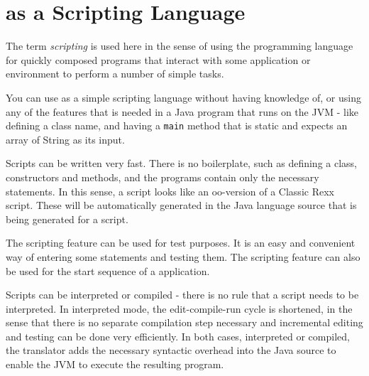 \chapter{\nr{} as a Scripting Language}\label{refscripting}
The term \emph{scripting} is used here in the sense of using the
programming language for quickly composed programs that interact with
some application or environment to perform a number of simple tasks.

You can use \nr{} as a simple scripting language without having
knowledge of, or using any of the features that is needed in a Java
program that runs on the JVM - like defining a class name, and having
a \texttt{main} method that is static and expects an array of String
as its input. 

Scripts can be written very fast. There is
no boilerplate, such as defining a class, constructors and methods, and the programs contain only
the necessary statements. In this sense, a \nr{} script looks like
an oo-version of a Classic Rexx script.  These will be automatically generated
in the Java language source that is being generated for a script.

The scripting feature can be used for test purposes. It is an easy and convenient way of entering some statements and testing them.
The scripting feature can also be used for the start sequence of a \nr{} application.

Scripts can be interpreted or compiled - there is no rule that a
script needs to be interpreted. In interpreted mode, the
edit-compile-run cycle is shortened, in the sense that there is no separate compilation
step necessary and incremental editing and testing can be done very efficiently. In both cases, interpreted or
compiled, the \nr{} translator adds the necessary syntactic overhead
into the Java source to enable
the JVM to execute the resulting program.
